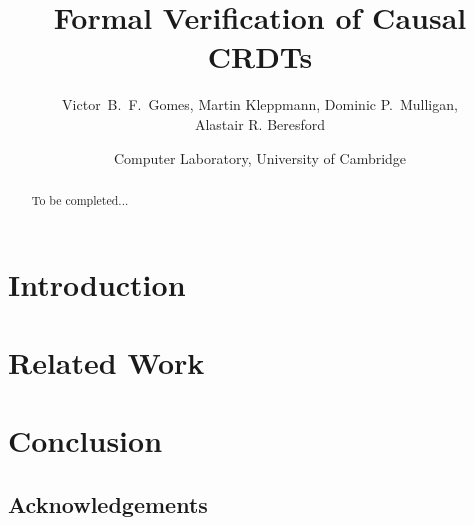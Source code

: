 \documentclass[letter,11pt]{article}
\title{Formal Verification of Causal CRDTs}
\author{Victor~B.~F.~Gomes, Martin Kleppmann, Dominic P.~Mulligan,\\Alastair R. Beresford}
\date{Computer Laboratory, University of Cambridge}
\begin{document}
\maketitle

\begin{abstract}
To be completed...
\end{abstract}


\section{Introduction}
\label{sect.introduction}

\section{Related Work}
\label{sect.relatedwork}

\cite{Zeller:2014fl}

\section{Conclusion}
\label{sect.conclusion}

\subsection*{Acknowledgements}


{}
\end{document}
